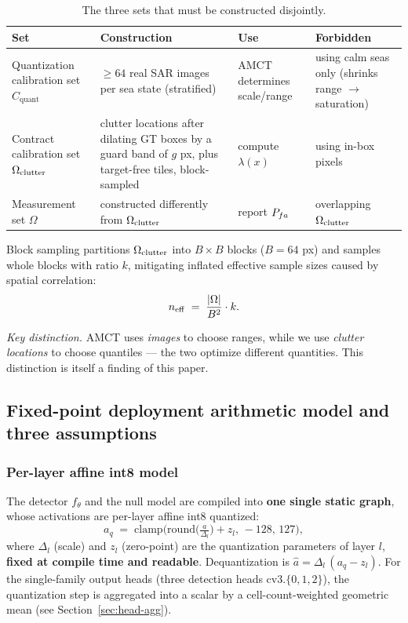 \begin{table}[htbp]
\centering
\caption{The three sets that must be constructed disjointly.}
\label{tab:three-sets}
\small
\begin{tabular}{p{3.2cm}p{4.4cm}p{2.4cm}p{4.2cm}}
\toprule
Set & Construction & Use & Forbidden \\
\midrule
Quantization calibration set $C_{\mathrm{quant}}$ & $\ge64$ real SAR images per sea state (stratified) & AMCT determines scale/range & using calm seas only (shrinks range $\to$ saturation) \\
Contract calibration set $\Omega_{\mathrm{clutter}}$ & clutter locations after dilating GT boxes by a guard band of $g$ px, plus target-free tiles, block-sampled & compute $\lambda(x)$ & using in-box pixels \\
Measurement set $\Omega$ & constructed differently from $\Omega_{\mathrm{clutter}}$ & report $P_{fa}$ & overlapping $\Omega_{\mathrm{clutter}}$ \\
\bottomrule
\end{tabular}
\end{table}

Block sampling partitions $\Omega_{\mathrm{clutter}}$ into $B\times B$ blocks ($B=64$ px) and samples whole blocks with ratio $k$, mitigating inflated effective sample sizes caused by spatial correlation:
\begin{equation}
n_{\mathrm{eff}} \;=\; \frac{|\Omega|}{B^{2}}\cdot k .
\label{eq:neff}
\end{equation}

\emph{Key distinction.} AMCT uses \emph{images} to choose ranges, while we use \emph{clutter locations} to choose quantiles --- the two optimize different quantities. This distinction is itself a finding of this paper.

\subsection{Fixed-point deployment arithmetic model and three assumptions}
\label{sec:arith}

\subsubsection{Per-layer affine int8 model}
\label{sec:affine}

The detector $f_\theta$ and the null model are compiled into \textbf{one single static graph}, whose activations are per-layer affine int8 quantized:
\begin{equation}
a_q \;=\; \mathrm{clamp}\!\Big(\mathrm{round}\!\big(\tfrac{a}{\Delta_l}\big)+z_l,\,-128,\,127\Big),
\label{eq:affine}
\end{equation}
where $\Delta_l$ (scale) and $z_l$ (zero-point) are the quantization parameters of layer $l$, \textbf{fixed at compile time and readable}.
Dequantization is $\hat{a}=\Delta_l\,(a_q-z_l)$.
For the single-family output heads (three detection heads $\mathrm{cv3}.\{0,1,2\}$), the quantization step is aggregated into a scalar by a cell-count-weighted geometric mean (see Section~\ref{sec:head-agg}).

